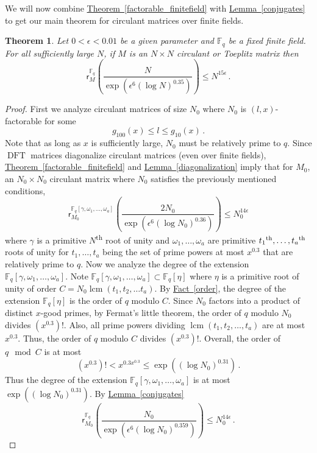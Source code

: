 \documentclass[11pt]{article}
\numberwithin{equation}{section}
\newtheorem{theorem}{Theorem}[section]
\theoremstyle{definition}
\theoremstyle{plain}
\newcommand{\expref}[2]{\hyperref[#2]{#1~\ref{#2}}}
\theoremstyle{definition}
\newcommand\F{{\mathbb{F}}}
\DeclareMathOperator{\lcm}{lcm}
\newcommand{\ts}{\textsuperscript}
\DeclareMathOperator{\DFT}{DFT}
\begin{document}
We will now combine \expref{Theorem}{factorable_finitefield} with \expref{Lemma}{conjugates} to get our main theorem for circulant matrices over finite fields.  
\begin{theorem}\label{circulant_finitefield}
Let $0 < \epsilon < 0.01$ be a given parameter and $\F_q$ be a fixed finite field.  For all sufficiently large $N$, if $M$ is an $N \times N$ %
 circulant or Toeplitz matrix %
 then   %
\[
\textsf{r}_{M}^{\F_q}\left(\frac{N}{\exp\left(\epsilon^6(\log N)^{0.35}\right)}\right) \leq N^{15 \epsilon} \,.
\]
\end{theorem}
\begin{proof}
First we analyze circulant matrices of size $N_0$ where $N_0$ is $(l,x)$-factorable for some 
\[
g_{100}(x) \leq l \leq g_{10}(x) \,.
\]
Note that as long as $x$ is sufficiently large, $N_0$ must be relatively prime to $q$.  Since $\DFT$ matrices  diagonalize circulant matrices (even over finite fields), \expref{Theorem}{factorable_finitefield} and \expref{Lemma}{diagonalization} imply that for $M_0$, an $N_0 \times N_0$ circulant matrix where $N_0$ satisfies the previously mentioned 
%
conditions, %
\[
\textsf{r}_{M_0}^{\F_q[\gamma, \omega_1, \dots , \omega_a]}\left(\frac{2N_0}{\exp\left(\epsilon^6(\log N_0)^{0.36}\right)}\right) \leq N_0^{14 \epsilon} 
\]
where $\gamma$ is a primitive $N$\ts{th} root of unity and $\omega_1, \dots , \omega_a$ are primitive $t_1\ts{th}, \dots , t_a\ts{th}$ roots of unity for $t_1, \dots , t_a$ being the set of prime powers at most $x^{0.3}$ that are relatively prime to $q$.  Now we analyze the degree of the extension $\F_q[\gamma, \omega_1, \dots , \omega_a]$.  Note $\F_q[\gamma, \omega_1, \dots , \omega_a] \subset \F_q[\eta]$ where $\eta$ is a primitive root of unity of order $C = N_0\lcm(t_1,t_2,\dots t_a)$.  By 
\expref{Fact}{order},  %
the degree of the extension $\F_q[\eta]$ is the order of $q$ modulo $C$. %
Since $N_0$ factors into a product of distinct $x$-good primes, %
%
by Fermat's little theorem, the order of $q$ modulo $N_0$ divides $\left(x^{0.3}\right)!$.  Also, all prime powers dividing $\lcm(t_1,t_2,\dots, t_a)$ are at most $x^{0.3}$.  Thus, the order of $q$ modulo $C$ divides $\left(x^{0.3}\right)!$.  Overall, the order of $q \mod C$ is at most
\[
\left(x^{0.3}\right)! < x^{0.3x^{0.3}} \leq \exp\left((\log N_0)^{0.31}\right) \,.
\]
Thus the degree of the extension $\F_q[\gamma, \omega_1, \dots , \omega_a]$ is at most $\exp\left((\log N_0)^{0.31}\right)$.  By \expref{Lemma}{conjugates}
\[
\textsf{r}_{M_0}^{\F_q}\left(\frac{N_0}{\exp\left(\epsilon^6(\log N_0)^{0.359}\right)}\right) \leq N_0^{14 \epsilon} \,.
\]
\end{proof}
\end{document}
